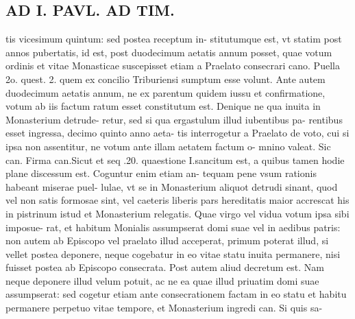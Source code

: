 \documentclass{article}
\begin{document}
\begin{pages}
\section*{AD I. PAVL. AD TIM. }
\marginpar{[ p.294 ]}\pstart tis vicesimum quintum: sed postea receptum in- stitutumque est, vt statim post annos pubertatis, id est, post duodecimum aetatis annum posset, quae votum ordinis et vitae Monasticae suscepisset etiam a Praelato consecrari cano. Puella 2o. quest. 2. quem ex concilio Triburiensi sumptum esse volunt. Ante autem duodecimum aetatis annum, ne ex parentum quidem iussu et confirmatione, votum ab iis factum ratum esset constitutum est. Denique ne qua inuita in Monasterium detrude- retur, sed si qua ergastulum illud iubentibus pa- rentibus esset ingressa, decimo quinto anno aeta- tis interrogetur a Praelato de voto, cui si ipsa non assentitur, ne votum ante illam aetatem factum o- mnino valeat. Sic can. Firma can.Sicut et seq .20. quaestione I.sancitum est, a quibus tamen hodie plane discessum est. Coguntur enim etiam an- tequam pene vsum rationis habeant miserae puel- lulae, vt se in Monasterium aliquot detrudi sinant, quod vel non satis formosae sint, vel caeteris liberis pars hereditatis maior accrescat his in pistrinum istud et Monasterium relegatis. Quae virgo vel vidua votum ipsa sibi imposue- rat, et habitum Monialis assumpserat domi suae vel in aedibus patris: non autem ab Episcopo vel praelato illud acceperat, primum poterat illud, si vellet postea deponere, neque cogebatur in eo vitae statu inuita permanere, nisi fuisset postea ab Episcopo consecrata. Post autem aliud decretum est. Nam neque deponere illud velum potuit, ac ne ea quae illud priuatim domi suae assumpserat: sed cogetur etiam ante consecrationem factam in eo statu et habitu permanere perpetuo vitae tempore, et Monasterium ingredi can. Si quis sa-  \pend

\end{pages}
\end{document}
